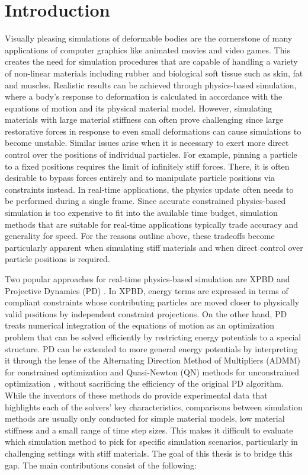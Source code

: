 \chapter{Introduction}\label{ch:introduction}
Visually pleasing simulations of deformable bodies are the cornerstone of many applications of computer graphics like animated movies and video games.
This creates the need for simulation procedures that are capable of handling a variety of non-linear materials including rubber and biological soft 
tissue such as skin, fat and muscles. Realistic results can be achieved through physics-based simulation, where a body's response to deformation is 
calculated in accordance with the equations of motion and its physical material model. However, simulating materials with large material stiffness 
can often prove challenging since large restorative forces in response to even small deformations can cause simulations to become unstable. Similar 
issues arise when it is necessary to exert more direct control over the positions of individual particles. For example, pinning a particle to a fixed 
positions requires the limit of infinitely stiff forces. There, it is often desirable to bypass forces entirely and to manipulate particle positions 
via constraints instead. In real-time applications, the physics update often needs to be performed during a single frame. Since accurate constrained 
physics-based simulation is too expensive to fit into the available time budget, simulation methods that are suitable for real-time applications typically 
trade accuracy and generality for speed. For the reasons outline above, these tradeoffs become particularly apparent when simulating stiff materials 
and when direct control over particle positions is required.

Two popular approaches for real-time physics-based simulation are XPBD \cite{macklin2016} and Projective Dynamics (PD) 
\cite{bouaziz2014}. In XPBD, energy terms are expressed in terms of compliant constraints whose contributing particles are moved closer to physically 
valid positions by independent constraint projections. On the other hand, PD treats numerical integration of the equations of motion as an optimization 
problem that can be solved efficiently by restricting energy potentials to a special structure. PD can be extended to more general energy potentials 
by interpreting it through the lense of the Alternating Direction Method of Multipliers (ADMM) for constrained optimization \cite{overby2017} and 
Quasi-Newton (QN) methods for unconstrained optimization \cite{liu2017}, without sacrificing the efficiency of the original PD algorithm. While the inventors 
of these methods do provide experimental data that highlights each of the solvers' key characteristics, comparisons between simulation methods are usually 
only conducted for simple material models, low material stiffness and a small range of time step sizes. This makes it difficult to evaluate which 
simulation method to pick for specific simulation scenarios, particularly in challenging settings with stiff materials. The goal of this thesis is to 
bridge this gap. The main contributions consist of the following:

